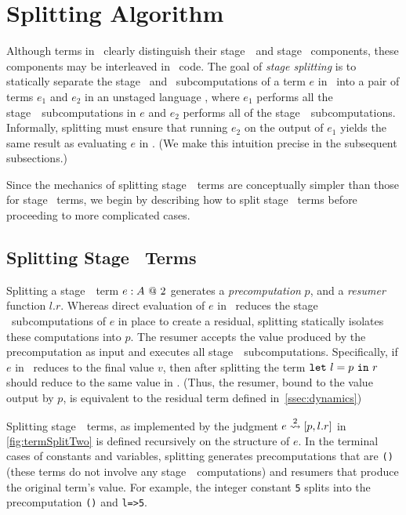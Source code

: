 \section{Splitting Algorithm}
\label{sec:splitting}

Although terms in \lang\ clearly distinguish their stage~\bbone\ and stage
\bbtwo\ components, these components may be interleaved in \lang\ code. The
goal of \emph{stage splitting} is to statically separate the stage \bbone\ and \bbtwo\ subcomputations
of a term $e$ in \lang\ into a pair of
terms $e_1$ and $e_2$ in an unstaged language \langmono, where $e_1$ performs all the
stage~\bbone\ subcomputations in $e$ and $e_2$ performs all of the stage~\bbtwo\ subcomputations.
Informally, splitting must ensure that running $e_2$ on the output of $e_1$ yields the same result 
as evaluating $e$ in \lang. (We make this intuition precise in the subsequent subsections.)

Since the mechanics of splitting stage~\bbtwo\ terms are conceptually simpler than those for stage \bbone\
terms, we begin by describing how to split stage \bbtwo\ terms before proceeding to more complicated cases.

\subsection {Splitting Stage \bbtwo\ Terms}

Splitting a stage~\bbtwo\ term ${e}:{A}~@~ 2$ generates
 a \emph{precomputation} $p$, and a \emph{resumer} function $l.r$. Whereas direct evaluation of $e$ in \lang\ reduces the stage \bbone\ subcomputations
of $e$ in place to create a residual, splitting statically isolates these computations into
$p$.  The resumer accepts the value produced by the precomputation as input
and executes all stage~\bbtwo\ subcomputations.   
Specifically, if $e$ in \lang\ reduces to the final value $v$, 
then after splitting the term ${\tt let}~{l} = {p}~{\tt in}~{r}$ should reduce to the same value in \langmono.
(Thus, the resumer, bound to the value output by $p$, is equivalent to the residual term defined in~\ref{ssec:dynamics})




Splitting stage~\bbtwo\ terms, as implemented by the judgment $e \overset{ 2}\rightsquigarrow
[p,l.r]$ in \cref{fig:termSplitTwo} is defined recursively on the structure of $e$.
In the terminal cases of constants and variables, splitting generates precomputations that are \texttt{()}
(these terms do not involve any stage~\bbone\ computations) and resumers that produce the original term's value.
For example, the integer constant \texttt{5} splits into the precomputation \texttt{()} and \texttt{l=>5}.

